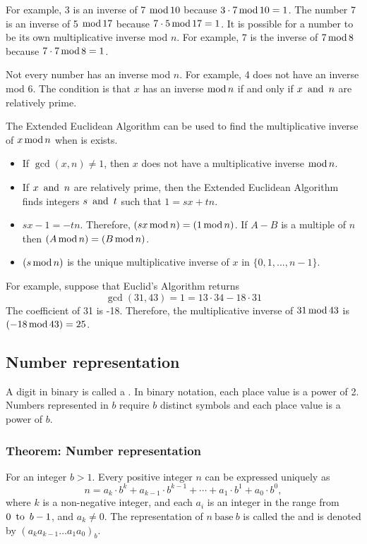 For example, 3 is an inverse of 7 $\operatorname{\text{mod}} 10$ because $3 \cdot 7 \operatorname{\text{mod}} 10 = 1$. The number 7 is an inverse of 5 $\operatorname{\text{mod}} 17$ because $7 \cdot 5 \operatorname{\text{mod}} 17 = 1$. It is possible for a number to be its own multiplicative inverse mod $n$. For example, $7$ is the inverse of $7 \operatorname{\text{mod}} 8$ because $7 \cdot 7 \operatorname{\text{mod}} 8 = 1$.

Not every number has an inverse mod $n$. For example, 4 does not have an inverse mod $6$. The condition is that $x$ has an inverse $\operatorname{\text{mod}} n$ if and only if $x \operatorname{~\text{and}~} n$ are relatively prime.

The Extended Euclidean Algorithm can be used to find the multiplicative inverse of $x \operatorname{\text{mod}} n$ when is exists.
\begin{itemize}
  \item If $\gcd(x, n) \neq 1$, then $x$ does not have a multiplicative inverse $\operatorname{\text{mod}} n$.
  \item If $x \operatorname{~\text{and}~} n$ are relatively prime, then the Extended Euclidean Algorithm finds integers $s \operatorname{~\text{and}~} t$ such that $1 = sx + tn$.
  \item $sx - 1 = -tn$. Therefore, $(sx \operatorname{\text{mod}} n) = (1 \operatorname{\text{mod}} n)$. If $A - B$ is a multiple of $n$ then $(A \operatorname{\text{mod}} n) = (B \operatorname{\text{mod}} n)$.
  \item $(s \operatorname{\text{mod}} n)$ is the unique multiplicative inverse of $x$ in $\{0, 1, \ldots, n-1\}$.
\end{itemize}
For example, suppose that Euclid's Algorithm returns
\[
  \gcd(31, 43) = 1 = 13 \cdot 34 - 18 \cdot 31
\]
The coefficient of 31 is -18. Therefore, the multiplicative inverse of $31 \operatorname{\text{mod}} 43$ is $(-18 \operatorname{\text{mod}} 43) = 25$.

\subsection{Number representation}
A digit in binary is called a . In binary notation, each place value is a power of 2. Numbers represented in  $b$ require $b$ distinct symbols and each place value is a power of $b$.

\subsubsection*{Theorem: Number representation}
For an integer $b>1$. Every positive integer $n$ can be expressed uniquely as
\[
  n = a_k \cdot b^k + a_{k-1} \cdot b^{k-1} + \cdots + a_1 \cdot b^1 + a_0 \cdot b^0,
\]
where $k$ is a non-negative integer, and each $a_i$ is an integer in the range from $0 \operatorname{~\text{to}~} b-1$, and $a_k \neq 0$.
The representation of $n~\text{base}~b$ is called the  and is denoted by $(a_ka_{k-1}\ldots a_1a_0)_b$.

